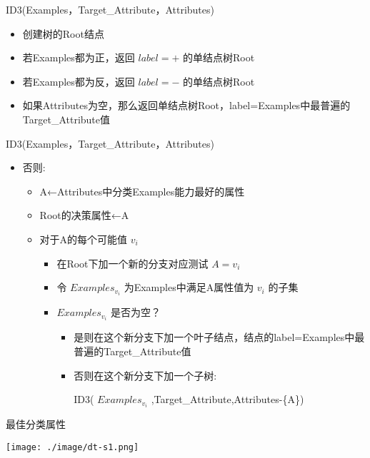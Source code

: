 \documentclass[presentation]{beamer}
\begin{document}
\begin{frame}[label={sec:org1bf9eae}]{ID3(Examples，Target\_Attribute，Attributes)}
\begin{itemize}
\item 创建树的Root结点
\item 若Examples都为正，返回 \(label =+\) 的单结点树Root
\item 若Examples都为反，返回 \(label =-\) 的单结点树Root
\item 如果Attributes为空，那么返回单结点树Root，label=Examples中最普遍的Target\_Attribute值
\end{itemize}
\end{frame}

\begin{frame}[label={sec:org04fff66}]{ID3(Examples，Target\_Attribute，Attributes)}
\begin{itemize}
\item 否则:
\begin{itemize}
\item A←Attributes中分类Examples能力最好的属性
\item Root的决策属性←A
\item 对于A的每个可能值 \(v_i\)
\begin{itemize}
\item 在Root下加一个新的分支对应测试 \(A=v_i\)
\item 令 \(Examples_{v_i}\) 为Examples中满足A属性值为 \(v_i\) 的子集
\item \(Examples_{v_i}\) 是否为空？
\begin{itemize}
\item 是则在这个新分支下加一个叶子结点，结点的label=Examples中最普遍的Target\_Attribute值
\item 否则在这个新分支下加一个子树: 

ID3( \(Examples_{v_i}\) ,Target\_Attribute,Attributes-\{A\})
\end{itemize}
\end{itemize}
\end{itemize}
\end{itemize}
\end{frame}

\begin{frame}[label={sec:orgd9f42ee}]{最佳分类属性}
\begin{center}
\texttt{[image: ./image/dt-s1.png]}
\end{center}
\end{frame}
\end{document}
